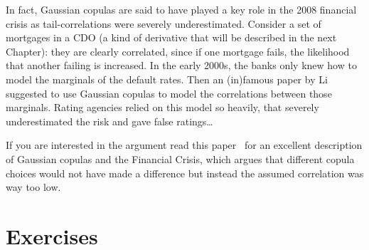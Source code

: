 In fact, Gaussian copulas are said to have played a key role in the 2008 financial crisis as tail-correlations were severely underestimated. Consider a set of mortgages in a CDO (a kind of derivative that will be described in the next Chapter): they are clearly correlated, since if one mortgage fails, the likelihood that another failing is increased. In the early 2000s, the banks only knew how to model the marginals of the default rates. Then an (in)famous paper by Li~\cite{bib:copula_li} suggested to use Gaussian copulas to model the correlations between those marginals. Rating agencies relied on this model so heavily, that severely underestimated the risk and gave false ratings\ldots

If you are interested in the argument read this paper~\cite{bib:copula_and_2008} for an excellent description of Gaussian copulas and the Financial Crisis, which argues that different copula choices would not have made a difference but instead the assumed correlation was way too low.

\section*{Exercises}

